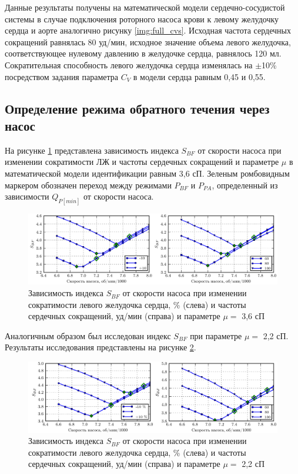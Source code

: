 Данные результаты получены на математической модели сердечно-сосудистой системы в случае подключения роторного насоса крови к левому желудочку сердца и аорте аналогично рисунку \ref{img:full_cvs}. Исходная частота сердечных сокращений равнялась 80 уд/мин, исходное значение объема левого желудочка, соответствующее нулевому давлению в желудочке сердца, равнялось 120 мл. Сократительная способность левого желудочка сердца изменялась на $\pm$10\% посредством задания параметра $C_V$ в модели сердца равным 0,45 и 0,55. 

\subsection*{Определение режима обратного течения через насос}

На рисунке \ref{img:pumping_states_bf_36} представлена зависимость индекса $S_{BF}$ от скорости насоса при изменении сократимости ЛЖ и частоты сердечных сокращений и параметре $\mu$ в математической модели идентификации равным 3,6 сП. Зеленым ромбовидным маркером обозначен переход между режимами $P_{BF}$ и $P_{PA}$, определенный из зависимости $Q_{P[min]}$ от скорости насоса.

\begin{figure}[ht] 
  \center
  \includegraphics [scale=1.0] {../images/c3_bf_36}
  \caption{Зависимость индекса $S_{BF}$ от скорости насоса при изменении сократимости левого желудочка сердца, \% (слева) и частоты сердечных сокращений, уд/мин (справа) и параметре $\mu =$ 3,6 сП} 
  \label{img:pumping_states_bf_36}  
\end{figure}

Аналогичным образом был исследован индекс $S_{BF}$ при параметре $\mu =$ 2,2 сП. Результаты исследования представлены на рисунке \ref{img:pumping_states_bf_22}.

\begin{figure}[ht] 
  \center
  \includegraphics [scale=1.0] {../images/c3_bf_22}
  \caption{Зависимость индекса $S_{BF}$ от скорости насоса при изменении сократимости левого желудочка сердца, \% (слева) и частоты сердечных сокращений, уд/мин (справа) и параметре $\mu =$ 2,2 сП} 
  \label{img:pumping_states_bf_22}  
\end{figure}

